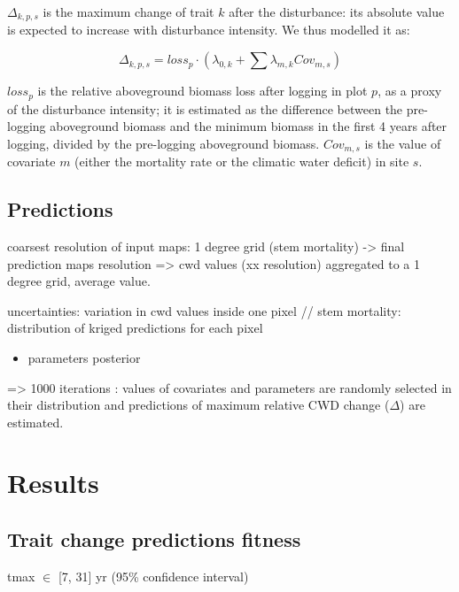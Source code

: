 \documentclass[]{elsarticle} %
\providecommand{\tightlist}{%
  \setlength{\itemsep}{0pt}\setlength{\parskip}{0pt}}
\begin{document}
\(\Delta_{k,p,s}\) is the maximum change of trait \(k\) after the
disturbance: its absolute value is expected to increase with disturbance
intensity. We thus modelled it as:

\begin{equation} 
\Delta_{k,p,s} = loss_p \cdot (\lambda_{0,k} + \sum \lambda_{m,k} Cov_{m,s}) 
\end{equation}

\(loss_p\) is the relative aboveground biomass loss after logging in
plot \(p\), as a proxy of the disturbance intensity; it is estimated as
the difference between the pre-logging aboveground biomass and the
minimum biomass in the first 4 years after logging, divided by the
pre-logging aboveground biomass. \(Cov_{m,s}\) is the value of covariate
\(m\) (either the mortality rate or the climatic water deficit) in site
\(s\).

\subsection{Predictions}\label{predictions}

coarsest resolution of input maps: 1 degree grid (stem mortality)
-\textgreater{} final prediction maps resolution =\textgreater{} cwd
values (xx resolution) aggregated to a 1 degree grid, average value.

uncertainties: variation in cwd values inside one pixel // stem
mortality: distribution of kriged predictions for each pixel

\begin{itemize}
\tightlist
\item
  parameters posterior
\end{itemize}

=\textgreater{} 1000 iterations : values of covariates and parameters
are randomly selected in their distribution and predictions of maximum
relative CWD change (\(\Delta\)) are estimated.

\section{Results}\label{results}

\subsection{Trait change predictions
fitness}\label{trait-change-predictions-fitness}

tmax \(\in\) {[}7, 31{]} yr (95\% confidence interval)
\end{document}
